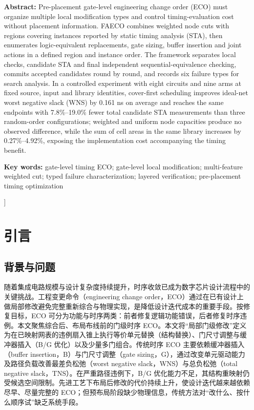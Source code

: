 \documentclass[twocolumn,10pt,fontset=windows]{ctexart}
\begin{document}
\begin{flushleft}
  {\bfseries Abstract:} {\small Pre-placement gate-level engineering change order (ECO) must organize multiple local modification types and control timing-evaluation cost without placement information. FAECO combines weighted node cuts with regions covering instances reported by static timing analysis (STA), then enumerates logic-equivalent replacements, gate sizing, buffer insertion and joint actions in a defined region and instance order. The framework separates local checks, candidate STA and final independent sequential-equivalence checking, commits accepted candidates round by round, and records six failure types for search analysis. In a controlled experiment with eight circuits and nine arms at fixed source, input and library identities, cover-first scheduling improves ideal-net worst negative slack (WNS) by 0.161 ns on average and reaches the same endpoints with 7.8\%--19.0\% fewer total candidate STA measurements than three random-order configurations; weighted and uniform node capacities produce no observed difference, while the sum of cell areas in the same library increases by 0.27\%--4.92\%, exposing the implementation cost accompanying the timing benefit.}\par
\vspace{3pt}
{\bfseries Key words:} {\small gate-level timing ECO; gate-level local modification; multi-feature weighted cut; typed failure characterization; layered verification; pre-placement timing optimization}\par
\end{flushleft}
]%


\section{引言}

\subsection{背景与问题}
随着集成电路规模与设计复杂度持续提升，时序收敛已成为数字芯片设计流程中的关键挑战。工程变更命令（engineering change order，ECO）通过在已有设计上做局部修改避免完整重新综合与物理实现，是降低设计迭代成本的重要手段。按修复目标，ECO 可分为功能与时序两类：前者修复逻辑功能错误，后者修复时序违例。本文聚焦综合后、布局布线前的门级时序 ECO。本文将“局部门级修改”定义为在已映射网表的违例扇入锥上执行等价单元替换（结构替换）、门尺寸调整与缓冲器插入（B/G 优化）以及少量多门组合。传统时序 ECO 主要依赖缓冲器插入（buffer insertion，B）与门尺寸调整（gate sizing，G），通过改变单元驱动能力及路径负载改善最差负松弛（worst negative slack，WNS）与总负松弛（total negative slack，TNS）。在严重路径违例下，B/G 优化能力不足，其结构重映射仍受候选空间限制\cite{ho2010eco,liu2021rlsizer,chen2024aito}。先进工艺下布局后修改的代价持续上升，使设计迭代越来越依赖尽早、尽量完整的 ECO；但预布局阶段缺少物理信息，传统方法对“改什么、按什么顺序试”缺乏系统手段。
\end{document}

